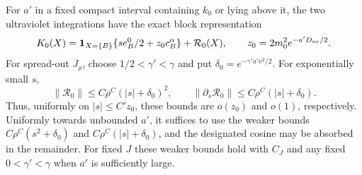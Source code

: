 \begin{proposition}\label{wh:uv}
For $a'$ in a fixed compact interval containing $k_0$ or lying above it,
the two ultraviolet integrations have the exact block representation
\begin{equation}\label{wh:initial-activity}
 K_0(X)=\mathbf 1_{X=\{B\}}\{s e_B^0/2+z_0c_B^\alpha\}
          +\mathcal R_0(X),\qquad
 z_0=2m_0^2e^{-a'D_{\rm uv}/2}.
\end{equation}
For spread-out $J_\rho$, choose $1/2<\gamma'<\gamma$ and put
$\delta_0=e^{-\gamma'a'v^2/2}$.  For exponentially small $s$,
\begin{equation}\label{wh:uv-sharp}
 \|\mathcal R_0\|\le C\rho^C(|s|+\delta_0)^2,
 \qquad
 \|\partial_s\mathcal R_0\|\le C\rho^C(|s|+\delta_0).
\end{equation}
Thus, uniformly on $|s|\le C'z_0$, these bounds are $o(z_0)$ and
$o(1)$, respectively.  Uniformly towards unbounded $a'$, it suffices
to use the weaker bounds $C\rho^C(s^2+\delta_0)$ and
$C\rho^C(|s|+\delta_0)$, and the designated cosine may be absorbed in
the remainder.  For fixed $J$ these weaker bounds hold with $C_J$ and
any fixed $0<\gamma'<\gamma$ when $a'$ is sufficiently large.
\end{proposition}


